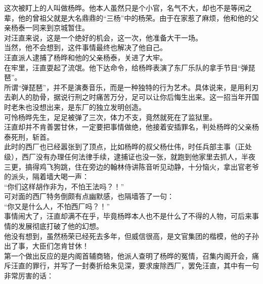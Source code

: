 \begin{multicols}{\theparacolNo}
这次被盯上的人叫做杨晔。他本人虽然只是个小官，名气不大，却也不是等闲之辈，他的曾祖父就是大名鼎鼎的“三杨”中的杨荣。由于在家惹了麻烦，他和他的父亲杨泰一同来到京城暂住。\\

对汪直来说，这是一个绝好的机会，这一次，他准备大干一场。\\

当然，他不会想到，这件事情最终也解决了他自己。\\

汪直派人逮捕了杨晔和他的父亲杨泰，关进了大牢。\\

在牢里，汪直耍起了流氓。他下达命令，给杨晔表演了东厂乐队的拿手节目“弹琵琶”。\\

所谓“弹琵琶”，并不是演奏音乐，而是一种独特的行为艺术。具体说来，是用利刃去剃人的肋骨，据说行刑之时痛苦万分，足可以让你后悔生出来。这一招当年开国时老朱也没想出来，是东厂的独立发明创造。\\

可怜杨晔先生，足足被弹了三次，体力不支，竟然就死在了监狱里。\\

汪直却并不肯善罢甘休，一定要把事情做绝，他接着安插罪名，判处杨晔的父亲杨泰死刑，斩首。\\

此时的西厂也已经嚣张到了顶点，比如杨晔的叔父杨仕伟，时任兵部主事（正处级），西厂没有办理任何法律手续，逮捕证也没一张，就跑到他家里去抓人，半夜三更，搞得鸡飞狗跳，住在旁边的翰林侍讲陈音听见动静，十分恼火，拿出官老爷的派头，隔着墙大喝一声：\\

“你们这样胡作非为，不怕王法吗？！”\\

可对面的西厂特务倒颇有点幽默感，也隔墙答了一句：\\

“你又是什么人，不怕西厂吗？！”\\

事情闹大了，汪直却满不在乎，毕竟杨晔本人也不是什么了不得的人物，可后来事情的发展彻底打破了他的幻想。\\

他没有想到，虽然杨荣已经死去多年，但威信很高，是文官集团的楷模，他的子孙出了事，大臣们怎肯甘休！\\

第一个做出反应的是内阁首辅商辂，他派人查明了杨晔的冤情，召集内阁开会，痛斥汪直的罪行，并写了一封奏折给朱见深，要求废除西厂，罢免汪直，其中有一句非常厉害的话：\\


\end{multicols}
